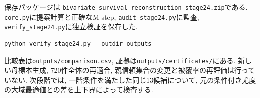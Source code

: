 保存パッケージは
\nolinkurl{bivariate_survival_reconstruction_stage24.zip}である.
\texttt{core.py}に提案計算と正確なM-step,
\texttt{audit\_stage24.py}に監査,
\texttt{verify\_stage24.py}に独立検証を保存した.
\begin{verbatim}
python verify_stage24.py --outdir outputs
\end{verbatim}
比較表は\nolinkurl{outputs/comparison.csv},
証拠は\nolinkurl{outputs/certificates/}にある.
新しい母標本生成, 720件全体の再適合,
親信頼集合の変更と被覆率の再評価は行っていない.
次段階では, 一階条件を満たした同じ13候補について,
元の条件付き尤度の大域最適値との差を上下界によって検査する.
